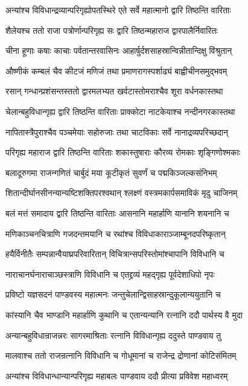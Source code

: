 \twolineshloka
{अन्यांश्च विविधान्द्रव्यान्परिगृह्योपतस्थिरे}
{एते सर्वे महात्मानो द्वारि तिष्ठन्ति वारिताः}


\twolineshloka
{शैलेयश्च ततो राजा पत्रोर्णान्परिगृह्य सः}
{द्वारि तिष्ठन्महाराज द्वारपालैर्निवारितः}


\twolineshloka
{चीना हूणाः कषाः काचाः पर्वतान्तरवासिनः}
{आहार्षुर्दशसाहस्रान्विन्नीतान्दिक्षु विंश्रुतान्}


\twolineshloka
{औष्णीकं कम्बलं चैव कीटजं मणिजं तथा}
{प्रमाणरागस्पर्शाढ्यं बाह्वीचीनसमुद्भवम्}


\twolineshloka
{रसान् गन्धान्प्रशंसन्तस्ततो द्वारमलभ्यत}
{खर्वटास्तोमराश्चैव शूरा वर्धनकास्तथा}


\twolineshloka
{चेलान्बहुविधान्गृह्य द्वारि तिष्ठन्ति वारिताः}
{प्राक्कोटा नाटकेयाश्च नन्दीनगरकास्तथा}


\twolineshloka
{नापितास्त्रैपुराश्चैव पञ्चमेयाः सहोरुजाः}
{तथा चाटविकाः सर्वे नानाद्रव्यपरिच्छदान्}


\twolineshloka
{परिगृह्य महाराज द्वारि तिष्ठन्ति वारिताः}
{शकास्तुषाराः कौरव्य रोमकाः शृङ्गिणोश्मकाः}


\twolineshloka
{बलादूरुगमा राजन्गणितं चार्बुदं मया}
{कूटीकृतं सुवर्णं च पद्मकिञ्जल्कसंनिभम्}


\twolineshloka
{शितान्दीर्घानसीनन्यान्यष्टिशक्तिपरश्वथान्}
{श्लक्ष्णं वस्त्रमकार्पसमाविकं मृदु चाजिनम्}


\twolineshloka
{बलं मत्तं समादाय द्वारि तिष्ठन्ति वारिताः}
{आसनानि महार्हाणि यानानि शयनानि च}


\twolineshloka
{मणिकाञ्चनचित्राणि गजदन्तमयानि च}
{रथांश्च विविधाकाराञ्जाम्बूनदपरिष्कृतान्}


\threelineshloka
{हयैर्विनीतैः सम्पन्नान्वैयाघ्रपरिवारितान्}
{विचित्रान्सपरिस्तोमांश्चापानि विविधानि च}
{}


\twolineshloka
{नाराचानर्घनाराचाञ्छस्त्राणि विविधानि च}
{एतद्द्रव्यं महद्गृह्य पूर्वदेशाधिपो नृपः}


\twolineshloka
{प्रविष्टो यज्ञसदनं पाण्डवस्य महात्मनः}
{जन्तुचेलान्द्विसाहस्रान्दुकूलान्ययुतानि च}


\twolineshloka
{कांस्यानि चैव भाण्डानि महार्हाणि कुथानि च}
{एतान्यन्यानि रत्नानि ददौ पार्थस्य वै मुदा}


\twolineshloka
{अन्यान्बहुविधान्राजन्नरः सागरमाश्रिताः}
{रत्नानि विविधान्गृह्य ददुस्ते पाण्डवाय तु}


\twolineshloka
{मालवाश्च ततो राजन्रत्नानि विविधानि च}
{गोधूमानां च राजेन्द्र द्रोणानां कोटिसंमितम्}


\twolineshloka
{अन्यांश्च विविधान्धान्यान्परिगृह्य महाबलः}
{पाण्डवाय ददौ प्रीत्या प्रविवेश महाध्वरम्}


